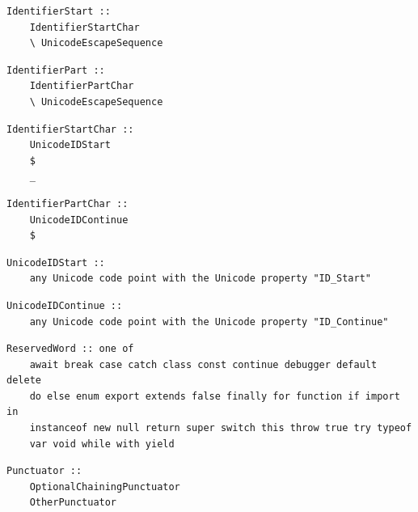 \noindent\textbf{\texttt{}}\par
\begin{lstlisting}
IdentifierStart ::
    IdentifierStartChar
    \ UnicodeEscapeSequence
\end{lstlisting}

\noindent\textbf{\texttt{}}\par
\begin{lstlisting}
IdentifierPart ::
    IdentifierPartChar
    \ UnicodeEscapeSequence
\end{lstlisting}

\noindent\textbf{\texttt{}}\par
\begin{lstlisting}
IdentifierStartChar ::
    UnicodeIDStart
    $
    _
\end{lstlisting}

\noindent\textbf{\texttt{}}\par
\begin{lstlisting}
IdentifierPartChar ::
    UnicodeIDContinue
    $
\end{lstlisting}

\noindent\textbf{\texttt{}}\par
\begin{lstlisting}
UnicodeIDStart ::
    any Unicode code point with the Unicode property "ID_Start"
\end{lstlisting}

\noindent\textbf{\texttt{}}\par
\begin{lstlisting}
UnicodeIDContinue ::
    any Unicode code point with the Unicode property "ID_Continue"
\end{lstlisting}

\noindent\textbf{\texttt{}}\par
\begin{lstlisting}
ReservedWord :: one of
    await break case catch class const continue debugger default delete
    do else enum export extends false finally for function if import in
    instanceof new null return super switch this throw true try typeof
    var void while with yield
\end{lstlisting}

\noindent\textbf{\texttt{}}\par
\begin{lstlisting}
Punctuator ::
    OptionalChainingPunctuator
    OtherPunctuator
\end{lstlisting}

